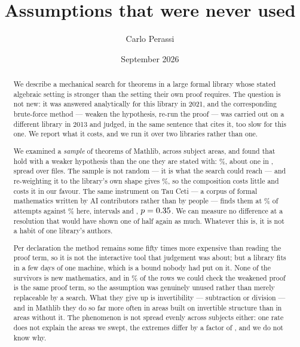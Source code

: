 \documentclass[11pt]{article}
\title{Assumptions that were never used}
\author{Carlo Perassi}
\date{September 2026}
\begin{document}
\maketitle



\begin{abstract}
We describe a mechanical search for theorems in a large formal library whose
stated algebraic setting is stronger than the setting their own proof requires.
The question is not new: it was answered analytically for this library in 2021,
and the corresponding brute-force method --- weaken the hypothesis, re-run the
proof --- was carried out on a different library in 2013 and judged, in the same
sentence that cites it, too slow for this one. We report what it costs, and we
run it over two libraries rather than one.

We examined a \emph{sample} of \theoremsExamined{} theorems of Mathlib, across
\allAreasWord{} subject areas, and found \theoremsWeakened{} that hold with a
weaker hypothesis than the one they are stated with: \theoremRate{}\%, about one
in \theoremOneIn{}, spread over \theoremFiles{} files. The sample is not random --- it is what the search could reach --- and
re-weighting it to the library's own shape gives \reweightedRate{}\%, so the
composition costs little and costs it in our favour. The same instrument on Tau Ceti
\cite{tauceti} --- a corpus of formal mathematics written by AI contributors
rather than by people --- finds them at \tauYield{}\% of attempts against
\allYield{}\% here, intervals \tauYieldCI{} and \allYieldCI{}, $p =
0.35{}$. We can measure no difference at a resolution that would have
shown one of half again as much. Whatever this is, it is not a habit of one
library's authors.

Per declaration the method remains some fifty times more expensive than reading
the proof term, so it is not the interactive tool that judgement was about; but
a library fits in a few days of one machine, which is a bound nobody had put on
it. None of the survivors is new mathematics, and in \unusedPercent{}\% of the
rows we could check the weakened proof is the same proof term, so the assumption
was genuinely unused rather than merely replaceable by a search. What they give
up is invertibility --- subtraction or division --- and in Mathlib they do so
far more often in
areas built on invertible structure than in areas without it. The phenomenon is
not spread evenly across subjects either: one rate does not explain the areas we
swept, the extremes differ by a factor of \densitySpread{}, and we do not know
why.
\end{abstract}
\end{document}
